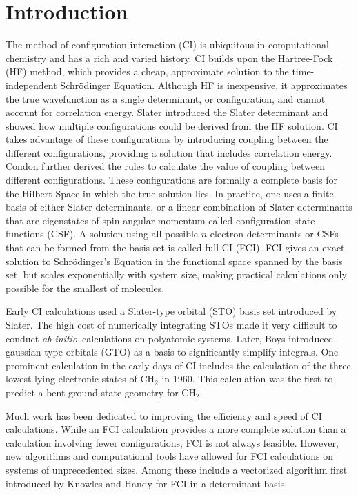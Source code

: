 \documentclass[final,3p,times,twocolumn]{elsarticle}
\newcommand{\ai}{\textit{ab-initio}}
\begin{document}
\section{Introduction} \label{sec:intro}
The method of configuration interaction (CI) is ubiquitous in computational chemistry and has a rich and varied history.\cite{shavitt} CI builds upon the Hartree-Fock (HF) method,\cite{hartree,fock} which provides a cheap, approximate solution to the time-independent Schr\"{o}dinger Equation. Although HF is inexpensive, it approximates the true wavefunction as a single determinant, or configuration, and cannot account for correlation energy.\cite{szabo} Slater introduced the Slater determinant and showed how multiple configurations could be derived from the HF solution.\cite{slater} CI takes advantage of these configurations by introducing coupling between the different configurations, providing a solution that includes correlation energy. Condon further derived the rules to calculate the value of coupling between different configurations.\cite{condon} These configurations are formally a complete basis for the Hilbert Space in which the true solution lies. In practice, one uses a finite basis of either Slater determinants, or a linear combination of Slater determinants that are eigenstates of spin-angular momentum called configuration state functions (CSF). A solution using all possible $n$-electron determinants or CSFs that can be formed from the basis set is called full CI (FCI). FCI gives an exact solution to Schr\"{o}dinger's Equation in the functional space spanned by the basis set, but scales exponentially with system size, making practical calculations only possible for the smallest of molecules.\cite{szabo}

Early CI calculations used a Slater-type orbital (STO) basis set introduced by Slater.\cite{sto} The high cost of numerically integrating STOs made it very difficult to conduct \ai\ calculations on polyatomic systems.\cite{shavitt} Later, Boys introduced gaussian-type orbitals (GTO) as a basis to significantly simplify integrals.\cite{gto} One prominent calculation in the early days of CI includes the calculation of the three lowest lying electronic states of CH$_2$ in 1960.\cite{boys-1960} This calculation was the first to predict a bent ground state geometry for CH$_2$.

Much work has been dedicated to improving the efficiency and speed of CI calculations. While an FCI calculation provides a more complete solution than a calculation involving fewer configurations, FCI is not always feasible. However, new algorithms and computational tools have allowed for FCI calculations on systems of unprecedented sizes.\cite{bendazzoli-1995} Among these include a vectorized algorithm first introduced by Knowles and Handy for FCI in a determinant basis.\cite{handy-1984,handy-1988,olsen,evangelisti-1993}
\end{document}
